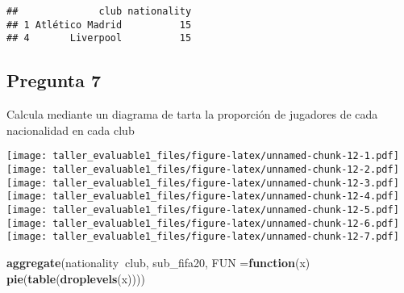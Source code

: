 \documentclass[
]{article}
\newenvironment{Shaded}{\begin{snugshade}}{\end{snugshade}}
\newcommand{\ControlFlowTok}[1]{\textcolor[rgb]{0.13,0.29,0.53}{\textbf{#1}}}
\newcommand{\DataTypeTok}[1]{\textcolor[rgb]{0.13,0.29,0.53}{#1}}
\newcommand{\KeywordTok}[1]{\textcolor[rgb]{0.13,0.29,0.53}{\textbf{#1}}}
\newcommand{\NormalTok}[1]{#1}
\newcommand{\OperatorTok}[1]{\textcolor[rgb]{0.81,0.36,0.00}{\textbf{#1}}}
\newcommand{\StringTok}[1]{\textcolor[rgb]{0.31,0.60,0.02}{#1}}
\begin{document}
\begin{verbatim}
##              club nationality
## 1 Atlético Madrid          15
## 4       Liverpool          15
\end{verbatim}

\hypertarget{pregunta-7}{%
\subsection{Pregunta 7}\label{pregunta-7}}

Calcula mediante un diagrama de tarta la proporción de jugadores de cada
nacionalidad en cada club

\begin{Shaded}
\end{Shaded}

\texttt{[image: taller\_evaluable1\_files/figure-latex/unnamed-chunk-12-1.pdf]}
\texttt{[image: taller\_evaluable1\_files/figure-latex/unnamed-chunk-12-2.pdf]}
\texttt{[image: taller\_evaluable1\_files/figure-latex/unnamed-chunk-12-3.pdf]}
\texttt{[image: taller\_evaluable1\_files/figure-latex/unnamed-chunk-12-4.pdf]}
\texttt{[image: taller\_evaluable1\_files/figure-latex/unnamed-chunk-12-5.pdf]}
\texttt{[image: taller\_evaluable1\_files/figure-latex/unnamed-chunk-12-6.pdf]}
\texttt{[image: taller\_evaluable1\_files/figure-latex/unnamed-chunk-12-7.pdf]}

\begin{Shaded}
\begin{Highlighting}[]
\KeywordTok{aggregate}\NormalTok{(nationality}\OperatorTok{~}\NormalTok{club, sub_fifa20, }\DataTypeTok{FUN =}\ControlFlowTok{function}\NormalTok{(x) }\KeywordTok{pie}\NormalTok{(}\KeywordTok{table}\NormalTok{(}\KeywordTok{droplevels}\NormalTok{(x))))}
\end{Highlighting}
\end{Shaded}
\end{document}

